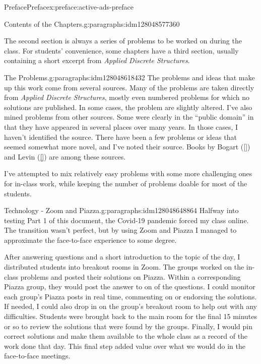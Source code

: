 \documentclass[oneside,10pt,]{book}
\newcommand{\xreffont}{\relax}
\numberwithin{equation}{section}
\begin{document}
\begin{preface}{Preface}{}{Preface}{}{}{x:preface:active-ads-preface}
\begin{paragraphs}{Contents of the Chapters.}{g:paragraphs:idm128048577360}
\par
The second section is always a series of problems to be worked on during the class. For students' convenience, some chapters have a third section, usually containing a short excerpt from \emph{Applied Discrete Structures}.%
\end{paragraphs}%
\begin{paragraphs}{The Problems.}{g:paragraphs:idm128048618432}%
The problems and ideas that make up this work come from several sources.  Many of the problems are taken directly from \emph{Applied Discrete Structures}, mostly even numbered problems for which no solutions are published. In some cases, the problem are slightly altered.  I've also mined problems from other sources.  Some were clearly in the ``public domain'' in that they have appeared in several places over many years.  In those cases, I haven't identified the source.   There have been a few problems or ideas that seemed somewhat more novel, and I've noted their source. Books by Bogart (\hyperlink{x:biblio:biblio-bogart-2017}{[{\xreffont 1}]}) and Levin (\hyperlink{x:biblio:biblio-levin-2020}{[{\xreffont 3}]}) are among these sources.%
\par
I've attempted to mix relatively easy problems with some more challenging ones for in-class work, while keeping the number of problems doable for most of the students.%
\end{paragraphs}%
\begin{paragraphs}{Technology - Zoom and Piazza.}{g:paragraphs:idm128048648864}%
Halfway into testing Part 1 of this document, the Covid-19 pandemic forced my class online. The transition wasn't perfect, but by using Zoom and Piazza I managed to approximate the face-to-face experience to some degree.%
\par
After answering questions and a short introduction to the topic of the day, I distributed students into breakout rooms in Zoom.  The groups worked on the in-class problems and posted their solutions on Piazza.  Within a corresponding Piazza group, they would post the answer to on of the questions.  I could monitor each group's Piazza posts in real time, commenting on or endorsing the solutions.  If needed, I could also drop in on the group's breakout room to help out with any difficulties. Students were brought back to the main room for the final 15 minutes or so to review the solutions that were found by the groups.  Finally, I would pin correct solutions and make them available to the whole class as a record of the work done that day. This final step added value over what we would do in the face-to-face meetings.%

\end{paragraphs}
\end{preface}
\end{document}
